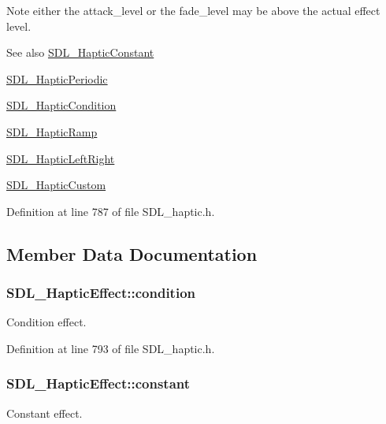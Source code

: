 Note either the attack\+\_\+level or the fade\+\_\+level may be above the actual effect level.

\begin{DoxySeeAlso}{See also}
\hyperlink{structSDL__HapticConstant}{S\+D\+L\+\_\+\+Haptic\+Constant} 

\hyperlink{structSDL__HapticPeriodic}{S\+D\+L\+\_\+\+Haptic\+Periodic} 

\hyperlink{structSDL__HapticCondition}{S\+D\+L\+\_\+\+Haptic\+Condition} 

\hyperlink{structSDL__HapticRamp}{S\+D\+L\+\_\+\+Haptic\+Ramp} 

\hyperlink{structSDL__HapticLeftRight}{S\+D\+L\+\_\+\+Haptic\+Left\+Right} 

\hyperlink{structSDL__HapticCustom}{S\+D\+L\+\_\+\+Haptic\+Custom} 
\end{DoxySeeAlso}


Definition at line 787 of file S\+D\+L\+\_\+haptic.\+h.



\subsection{Member Data Documentation}
\hypertarget{unionSDL__HapticEffect_aa8fdd1ba202ccd7e61f48ef9977080d2}{
\subsubsection[{condition}]{ S\+D\+L\+\_\+\+Haptic\+Effect\+::condition}}\label{unionSDL__HapticEffect_aa8fdd1ba202ccd7e61f48ef9977080d2}
Condition effect. 

Definition at line 793 of file S\+D\+L\+\_\+haptic.\+h.

\hypertarget{unionSDL__HapticEffect_ac435275e9683d6cc5d65b9c7cc2ec659}{
\subsubsection[{constant}]{ S\+D\+L\+\_\+\+Haptic\+Effect\+::constant}}\label{unionSDL__HapticEffect_ac435275e9683d6cc5d65b9c7cc2ec659}
Constant effect. 

